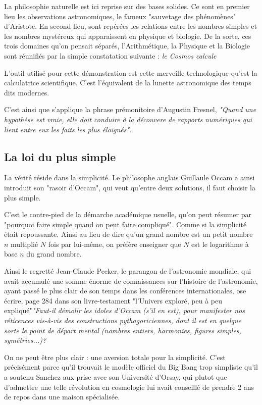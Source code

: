 \documentclass[a4paper,12pt]{article}
\begin{document}
La philosophie naturelle est ici reprise sur des bases solides. Ce sont en premier lieu les observations astronomiques, le fameux "sauvetage des phénomènes" d'Aristote. En second lieu, sont repérées les relations entre les nombres simples et les nombres mystéreux qui apparaissent en physique et biologie. De la sorte, ces trois domaines qu'on pensait séparés, l'Arithmétique, la Physique et la Biologie sont réunifiés par la simple constatation suivante : \textit{ le Cosmos calcule}

L'outil utilisé pour cette démonstration est cette merveille technologique qu'est la calculatrice scientifique. C'est l'équivalent de la lunette astronomique des temps dits modernes.

C'est ainsi que s'applique la phrase prémonitoire d'Augustin Fresnel, \textit{"Quand une hypothèse est vraie, elle doit conduire à la découvere de rapports numériques qui lient entre eux les faits les plus éloignés".} 

\subsection{La loi du plus simple}

La vérité réside dans la simplicité. Le philosophe anglais Guillaule Occam a ainsi introduit son "rasoir d'Occam", qui veut qu'entre deux solutions, il faut choisir la plus simple.


C'est le contre-pied de la démarche académique usuelle, qu'on peut résumer par "pourquoi faire simple quand on peut faire compliqué". Comme si la simplicité était repoussante. Ainsi au lieu de dire qu'un grand nombre est un petit nombre $n$ multiplié $N$ fois par lui-même, on préfère enseigner que $N$ est le logarithme à base $n$ du grand nombre. 


Ainsi le regretté Jean-Claude Pecker, le parangon de l'astronomie mondiale, qui avait accumulé une somme énorme de connaissances sur l'histoire de l'astronomie, ayant passé le plus clair de son temps dans les conférences internationales, ose écrire, page 284 dans son livre-testament "l'Univers exploré, peu à peu expliqué"\textit{"Faut-il démolir les idoles d'Occam (s'il en est), pour manifester nos réticences vis-à-vis des constructions pythagoriciennes, dont il est en quelque sorte le point de départ mental (nombres entiers, harmonies, figures simples, symétries...)?}

On  ne peut être plus clair : une aversion totale pour la simplicité. C'est précisément parce qu'il trouvait le modèle officiel du Big Bang trop simpliste qu'il a soutenu Sanchez aux prise avec son Université d'Orsay, qui plutot que d'admettre une telle révolution en cosmologie lui avait conseillé de prendre 2 ans de repos dans une maison spécialisée.
\end{document}

